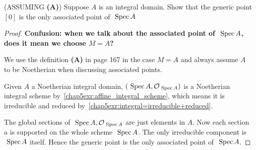 \documentclass[11pt]{book} %
\begin{document}
\begin{exr}\label{chap5exr:integral_associated_point_generic_point}(ASSUMING \textbf{(A)})
Suppose $A$ is an integral domain. Show that the generic point $[0]$ is the only associated point of $\text{ Spec\,} A$
\end{exr}
\begin{proof}
\textbf{Confusion: when we talk about the associated point of $\text{ Spec\,} A$, does it mean we choose $M=A$?}
 
We use the definition \textbf{(A)} in page 167 in the case $M=A$ and always assume $A$ to be Noetherian when discussing associated points.

Given $A$  a Noetherian integral domain, $(\text{ Spec\,} A,{\cal O}_{\text{ Spec\,} A})$ is a Noetherian integral scheme by~\ref{chap5exr:affine_integral_scheme}, which means it is irreducible and reduced by~\ref{chap5exr:integral=irreducible+reduced}. 

The global sections of $\text{ Spec\,} A,{\cal O}_{\text{ Spec\,} A}$ are just elements in $A$. Now each section $a$ is supported on the whole scheme $\text{ Spec\,} A$. The only irreducible component is $\text{ Spec\,} A$ itself. Hence the generic point is the only associated point of $\text{ Spec\,} A$.
\end{proof}
\end{document}
